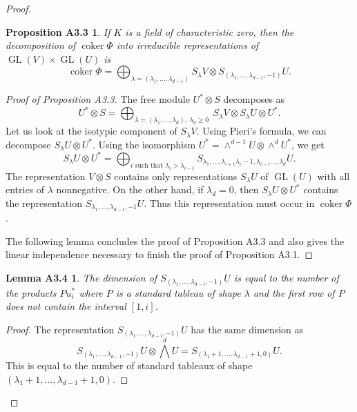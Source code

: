 \documentclass{tran-l}
\theoremstyle{plain}
\newtheorem*{theorem21}{Proposition A3.3}
\newtheorem*{theorem22}{Lemma A3.4}
\theoremstyle{remark}
\theoremstyle{definition}
\newcommand{\GL}{\operatorname{GL}}
\newcommand{\coker}{\operatorname{coker}}
\begin{document}
\begin{proof}
\begin{theorem21}
If $K$ is a field of
characteristic zero, then
the decomposition of $\coker \Phi $ into irreducible
representations of $\GL(V)\times \GL(U)$ is
\begin{equation*}\coker \Phi = \bigoplus _{\lambda = (\lambda _{1} ,\ldots
,\lambda _{d-1})} S_{\lambda }V\otimes S_{(\lambda _{1} ,\ldots ,\lambda
_{d-1}, -1 )}U. 
\end{equation*}
\end{theorem21}

\begin{proof}[Proof of Proposition \textup{A3.3}]
The free module 
$U^{*}\otimes S$ 
decomposes as 
\begin{equation*}U^{*}\otimes S =\bigoplus _{\lambda = (\lambda _{1} ,\ldots ,\lambda _{d}),\ \lambda _{d}\ge 0}
\ S_{\lambda }V\otimes S_{\lambda }U\otimes U^{*} .
\end{equation*}
Let us look at the isotypic component of $S_{\lambda }V$. 
Using Pieri's formula, we can decompose 
$S_{\lambda }U\otimes U^{*}$. 
Using the isomorphism $U^{*} =\wedge ^{d-1} U\otimes \wedge ^{d} U^{*}$, we get
\begin{equation*}S_{\lambda }U\otimes U^{*} =
\bigoplus _{i{\text{ such\ that }} \lambda _{i}>\lambda _{i-1}}
S_{\lambda _{1} ,\ldots ,\lambda _{i+1}\lambda _{i} -1,\lambda _{i-1}\ldots ,
\lambda _{d} }U.
\end{equation*}
The representation $V\otimes S$
contains only representations $S_{\lambda }U$ of $\GL(U)$
with all entries of $\lambda $ nonnegative.
On the other hand, if $\lambda _{d} =0$, then 
$S_{\lambda }U\otimes U^{*}$ contains the representation $S_{\lambda _{1}
,\ldots ,\lambda _{d-1}, -1}U$. Thus this representation must occur in
$\coker \Phi $.

The following
lemma concludes the proof of Proposition A3.3 and also gives
the linear independence necessary to finish
the proof of Proposition A3.1.
\renewcommand{\qed}{} \end{proof}

\begin{theorem22}
The dimension of 
$S_{(\lambda _{1} ,\ldots ,\lambda _{d-1},-1)}U$ 
is equal to the number of the products $P u_{i}^{*}$ where
$P$ is a standard tableau of shape $\lambda $ and the first row of
$P$ does not contain the interval $[1,i]$.
\end{theorem22}

\begin{proof} 
The representation
$S_{(\lambda _{1} ,\ldots ,\lambda _{d-1},-1)}U$ 
has the same dimension as 
\[S_{(\lambda _{1},\ldots ,\lambda _{d-1} ,-1)}U\otimes \bigwedge ^{d} U 
= S_{(\lambda _{1} +1,\ldots ,\lambda _{d-1}+1,0)}U.\]
This is equal to the number of
standard tableaux of shape 
$(\lambda _{1} +1,\ldots ,\lambda _{d-1}+1,\allowbreak 0)$. 


\end{proof}
\end{proof}
\end{document}
